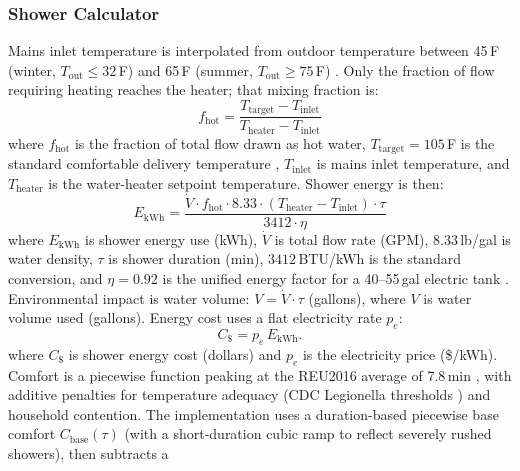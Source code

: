\documentclass[final,3p,times]{elsarticle}
\begin{document}
\subsubsection{Shower Calculator}
Mains inlet temperature is interpolated from outdoor temperature between 45\,\textdegree{}F
(winter, $T_{\mathrm{out}} \le 32$\,\textdegree{}F) and 65\,\textdegree{}F (summer,
$T_{\mathrm{out}} \ge 75$\,\textdegree{}F) \cite{hendron2008,maguire2013}. Only the
fraction of flow requiring heating reaches the heater; that mixing fraction is:
\begin{equation}
  f_{\mathrm{hot}} = \frac{T_{\mathrm{target}} - T_{\mathrm{inlet}}}
                          {T_{\mathrm{heater}} - T_{\mathrm{inlet}}}
  \label{eq:shower_fraction}
\end{equation}
\noindent where $f_{\mathrm{hot}}$ is the fraction of total flow drawn as hot water,
$T_{\mathrm{target}} = 105$\,\textdegree{}F is the standard comfortable delivery temperature
\cite{zhang2023}, $T_{\mathrm{inlet}}$ is mains inlet temperature,
and $T_{\mathrm{heater}}$ is the water-heater setpoint temperature. Shower energy is then:
\begin{equation}
  E_{\mathrm{kWh}} = \frac{\dot{V} \cdot f_{\mathrm{hot}} \cdot 8.33 \cdot
                            (T_{\mathrm{heater}} - T_{\mathrm{inlet}}) \cdot \tau}
                          {3412 \cdot \eta}
  \label{eq:shower_energy}
\end{equation}
\noindent where $E_{\mathrm{kWh}}$ is shower energy use (kWh), $\dot{V}$ is total flow rate (GPM),
$8.33$\,lb/gal is water density, $\tau$ is shower duration (min), $3412$\,BTU/kWh is the standard conversion,
and $\eta = 0.92$ is the unified energy factor for a 40--55\,gal electric tank \cite{rheem2025}.
Environmental impact is water volume: $V = \dot{V} \cdot \tau$ (gallons), where $V$ is water volume used (gallons).
Energy cost uses a flat electricity rate $p_e$:
\begin{equation}
  C_{\$}=p_e\,E_{\mathrm{kWh}}.
  \label{eq:shower_cost}
\end{equation}
\noindent where $C_{\$}$ is shower energy cost (dollars) and $p_e$ is the electricity price (\$/kWh).
Comfort is a piecewise function peaking at the REU2016 average of 7.8\,min \cite{reu2016,harrispoll2024}, with additive
penalties for temperature adequacy (CDC Legionella thresholds \cite{cdc2026}) and household
contention. The implementation uses a duration-based piecewise base comfort $C_{\mathrm{base}}(\tau)$
(with a short-duration cubic ramp to reflect severely rushed showers), then subtracts a
\end{document}
